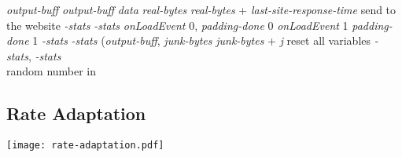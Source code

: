 \documentclass[10pt,journal]{IEEEtran}
\newcommand{\csbuflo} {Congestion-Sensitive BuFLO\xspace}
\newcommand{\csb} {CS-BuFLO\xspace}
\begin{document}
\begin{algorithm}[ht!]
  \caption{The main loop of the \csbuflo server.}
  \label{alg:csbuflo-server}
  \begin{algorithmic}
        \State 
{}
			\State \emph{output-buff}  \emph{output-buff}  \emph{data}
\State \emph{real-bytes}  \emph{real-bytes} + 
          \State \emph{last-site-response-time}  
          \State send  to the website
		  \State \emph{-stats}  \emph{-stats}  
\State \emph{onLoadEvent}  0, \emph{padding-done}  0
          \State \emph{onLoadEvent}  1
          \State \emph{padding-done}  1
		  \State \emph{-stats}  \emph{-stats}   
\EndIf
          \State (\emph{output-buff},   
          \State \emph{junk-bytes}  \emph{junk-bytes} + \emph{j}
        \EndIf
{}
			\State reset all variables
\Else{}
          \If{} 
            \State 
            \State \emph{-stats},
            \State \emph{-stats}   
          \EndIf
          \\
            \State  random number in 
          \EndIf
        \EndIf
      \EndWhile
    \EndFunction
  \end{algorithmic}
\end{algorithm}

\subsection{Rate Adaptation}
\label{ssec:rate-adaptation}



\begin{figure*}[t]
  \centering
  \texttt{[image: rate-adaptation.pdf]}
  \caption{Rate adaptation in \csb.  is updated based on the packets
	  transmitted to the other end between  and . Time intervals
	  between two consecutive packets are stored in an array .
	  The two packets under consideration both contain some real payload
	  data and they belong to the same burst. i.e. 
	  and .}
  \label{fig:rate-adaptation}
\end{figure*}
\end{document}
